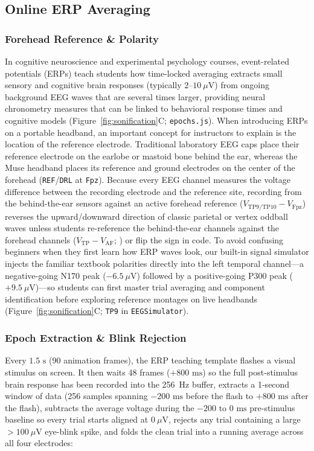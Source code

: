 \documentclass[11pt]{article}
\begin{document}
\subsection{Online ERP Averaging}

\subsubsection{Forehead Reference \& Polarity}
In cognitive neuroscience and experimental psychology courses, event-related potentials (ERPs) teach students how time-locked averaging extracts small sensory and cognitive brain responses (typically $2\text{--}10\ \mu\text{V}$) from ongoing background EEG waves that are several times larger, providing neural chronometry measures that can be linked to behavioral response times and cognitive models \citep{luck2014introduction,krigolson2017choosing,frischkorn2018cognitive,schubert2023enhancing,nunez2024tutorial} (Figure~\ref{fig:sonification}C; \texttt{epochs.js}). When introducing ERPs on a portable headband, an important concept for instructors to explain is the location of the reference electrode. Traditional laboratory EEG caps place their reference electrode on the earlobe or mastoid bone behind the ear, whereas the Muse headband places its reference and ground electrodes on the center of the forehead (\texttt{REF}/\texttt{DRL} at \texttt{Fpz}). Because every EEG channel measures the voltage difference between the recording electrode and the reference site, recording from the behind-the-ear sensors against an active forehead reference ($V_{\text{TP9/TP10}} - V_{\text{Fpz}}$) reverses the upward/downward direction of classic parietal or vertex oddball waves unless students re-reference the behind-the-ear channels against the forehead channels ($V_{\text{TP}} - V_{\text{AF}}$; \citealp{krigolson2017choosing}) or flip the sign in code. To avoid confusing beginners when they first learn how ERP waves look, our built-in signal simulator injects the familiar textbook polarities directly into the left temporal channel---a negative-going N170 peak ($-6.5\ \mu\text{V}$) followed by a positive-going P300 peak ($+9.5\ \mu\text{V}$)---so students can first master trial averaging and component identification before exploring reference montages on live headbands (Figure~\ref{fig:sonification}C; \texttt{TP9} in \texttt{EEGSimulator}).

\subsubsection{Epoch Extraction \& Blink Rejection}
Every $1.5\text{ s}$ (90 animation frames), the ERP teaching template flashes a visual stimulus on screen. It then waits 48 frames ($+800\text{ ms}$) so the full post-stimulus brain response has been recorded into the 256~Hz buffer, extracts a 1-second window of data (256 samples spanning $-200\text{ ms}$ before the flash to $+800\text{ ms}$ after the flash), subtracts the average voltage during the $-200\text{ to }0\text{ ms}$ pre-stimulus baseline so every trial starts aligned at $0\ \mu\text{V}$, rejects any trial containing a large $>100\ \mu\text{V}$ eye-blink spike, and folds the clean trial into a running average across all four electrodes:
\end{document}
